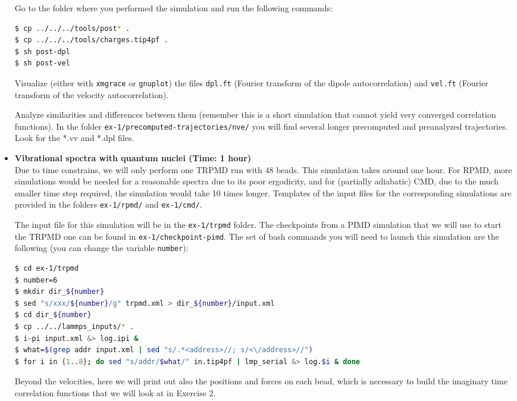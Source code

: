 \documentclass{article}
\begin{document}
\begin{Exercise}[label={realtime},title={Velocity and dipole real time correlation functions}]
\begin{itemize}
Go to the folder where you performed the simulation and run the following commands:

\begin{lstlisting}[language=Bash,emph={\$}]
$ cp ../../../tools/post* .
$ cp ../../../tools/charges.tip4pf .
$ sh post-dpl
$ sh post-vel
\end{lstlisting}

Visualize (either with \texttt{xmgrace} or \texttt{gnuplot}) the files \texttt{dpl.ft} (Fourier transform of the dipole autocorrelation) and \texttt{vel.ft} (Fourier transform of the velocity autocorrelation). 

Analyze similarities and differences between them (remember this is a short simulation that cannot yield very converged correlation functions). In the folder \texttt{ex-1/precomputed-trajectories/nve/} you will find several longer precomputed and preanalyzed trajectories. Look for the *.vv and *.dpl files.


\item {\bf Vibrational spectra with quantum nuclei (Time: 1 hour)} \\
Due to time constrains, we will only perform one TRPMD run with 48 beads.
This simulation takes around one hour. For RPMD, more simulations would be needed for a reasonable spectra due to its poor ergodicity, and for (partially adiabatic) CMD, due to the much smaller time step required, the simulation would take 10 times longer. Templates of the input files for the corresponding simulations are provided in the folders \texttt{ex-1/rpmd/} and \texttt{ex-1/cmd/}.

The input file for this simulation will be in the \texttt{ex-1/trpmd} folder. The checkpoints from a PIMD simulation that we will use to start the TRPMD one can be found in \texttt{ex-1/checkpoint-pimd}. The set of bash commands you will need to launch this simulation are the following (you can change the variable \texttt{number}):

\begin{lstlisting}[language=Bash,emph={\$}]
$ cd ex-1/trpmd
$ number=6
$ mkdir dir_${number} 
$ sed "s/xxx/${number}/g" trpmd.xml > dir_${number}/input.xml
$ cd dir_${number}
$ cp ../../lammps_inputs/* .
$ i-pi input.xml &> log.ipi &
$ what=$(grep addr input.xml | sed "s/.*<address>//; s/<\/address>//")
$ for i in {1..8}; do sed "s/addr/$what/" in.tip4pf | lmp_serial &> log.$i & done
\end{lstlisting}


Beyond the velocities, here we will print out also the positions and forces on each bead, which is necessary to build the imaginary time correlation functions that we will look at in Exercise 2.


\end{itemize}
\end{Exercise}
\end{document}
